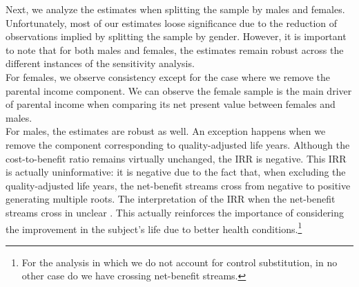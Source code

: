 \noindent Next, we analyze the estimates when splitting the sample by males and females. Unfortunately, most of our estimates loose significance due to the reduction of observations implied by splitting the sample by gender. However, it is important to note that for both males and females, the estimates remain robust across the different instances of the sensitivity analysis.\\

\noindent For females, we observe consistency except for the case where we remove the parental income component. We can observe the female sample is the main driver of parental income when comparing its net present value between females and males.\\

\noindent For males, the estimates are robust as well. An exception happens when we remove the component corresponding to quality-adjusted life years. Although the cost-to-benefit ratio remains virtually unchanged, the IRR is negative. This IRR is actually uninformative: it is negative due to the fact that, when excluding the quality-adjusted life years, the net-benefit streams cross from negative to positive generating multiple roots. The interpretation of the IRR when the net-benefit streams cross in unclear \citep{Arrow-Levhari_1969_EJ}. This actually reinforces the importance of considering the improvement in the subject's life due to better health conditions.\footnote{For the analysis in which we do not account for control substitution, in no other case do we have crossing net-benefit streams.}\\

